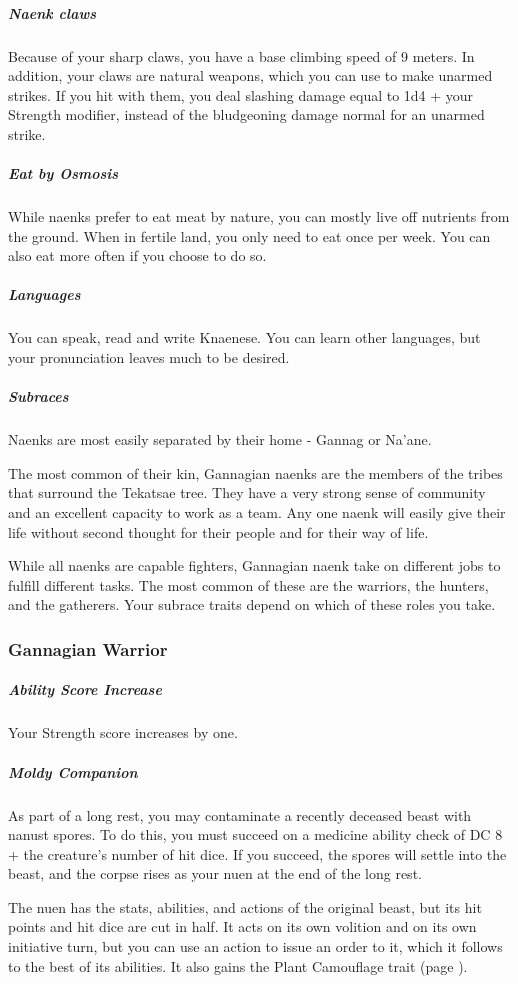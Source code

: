 \begin{linenumbers}
\subparagraph{Naenk claws} Because of your sharp claws, you have a base climbing speed of 9 meters.
In addition, your claws are natural weapons, which you can use to make unarmed strikes.
If you hit with them, you deal slashing damage equal to 1d4 + your Strength modifier, instead of the bludgeoning damage normal for an unarmed strike.

\subparagraph{Eat by Osmosis} While naenks prefer to eat meat by nature, you can mostly live off nutrients from the ground.
When in fertile land, you only need to eat once per week.
You can also eat more often if you choose to do so.

\subparagraph{Languages} You can speak, read and write Knaenese.
You can learn other languages, but your pronunciation leaves much to be desired.


\subparagraph{Subraces} Naenks are most easily separated by their home - Gannag or Na'ane.

The most common of their kin, Gannagian naenks are the members of the tribes that surround the Tekatsae tree.
They have a very strong sense of community and an excellent capacity to work as a team.
Any one naenk will easily give their life without second thought for their people and for their way of life.

While all naenks are capable fighters, Gannagian naenk take on different jobs to fulfill different tasks.
The most common of these are the warriors, the hunters, and the gatherers.
Your subrace traits depend on which of these roles you take.

\subsubsection{Gannagian Warrior}
\subparagraph{Ability Score Increase} Your Strength score increases by one.

\subparagraph{Moldy Companion} As part of a long rest, you may contaminate a recently deceased beast with nanust spores.
To do this, you must succeed on a medicine ability check of DC 8 + the creature's number of hit dice.
If you succeed, the spores will settle into the beast, and the corpse rises as your nuen at the end of the long rest.

The nuen has the stats, abilities, and actions of the original beast, but its hit points and hit dice are cut in half.
It acts on its own volition and on its own initiative turn, but you can use an action to issue an order to it, which it follows to the best of its abilities.
It also gains the Plant Camouflage trait (page \pageref{trait::plantcamouflage}).


\end{linenumbers}
